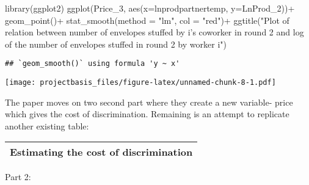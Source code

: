 \documentclass[
]{article}
\newenvironment{Shaded}{\begin{snugshade}}{\end{snugshade}}
\newcommand{\AttributeTok}[1]{\textcolor[rgb]{0.77,0.63,0.00}{#1}}
\newcommand{\FunctionTok}[1]{\textcolor[rgb]{0.00,0.00,0.00}{#1}}
\newcommand{\NormalTok}[1]{#1}
\newcommand{\SpecialCharTok}[1]{\textcolor[rgb]{0.00,0.00,0.00}{#1}}
\newcommand{\StringTok}[1]{\textcolor[rgb]{0.31,0.60,0.02}{#1}}
\begin{document}
\begin{Shaded}
\begin{Highlighting}[]
\FunctionTok{library}\NormalTok{(ggplot2)}
\FunctionTok{ggplot}\NormalTok{(Price\_3, }\FunctionTok{aes}\NormalTok{(}\AttributeTok{x=}\NormalTok{lnprodpartnertemp, }\AttributeTok{y=}\NormalTok{LnProd\_2))}\SpecialCharTok{+}
  \FunctionTok{geom\_point}\NormalTok{()}\SpecialCharTok{+}
  \FunctionTok{stat\_smooth}\NormalTok{(}\AttributeTok{method =} \StringTok{"lm"}\NormalTok{, }\AttributeTok{col =} \StringTok{"red"}\NormalTok{)}\SpecialCharTok{+}
  \FunctionTok{ggtitle}\NormalTok{(}\StringTok{"Plot of relation between number of envelopes stuffed by i’s coworker in round 2 and log of the number of envelopes stuffed in round 2}
\StringTok{ by worker i"}\NormalTok{)}
\end{Highlighting}
\end{Shaded}

\begin{verbatim}
## `geom_smooth()` using formula 'y ~ x'
\end{verbatim}

\texttt{[image: projectbasis\_files/figure-latex/unnamed-chunk-8-1.pdf]}

The paper moves on two second part where they create a new variable-
price which gives the cost of discrimination. Remaining is an attempt to
replicate another existing table:

\begin{longtable}[]{@{}c@{}}
\toprule
\endhead
Estimating the cost of discrimination \\
\bottomrule
\end{longtable}

Part 2:
\end{document}
